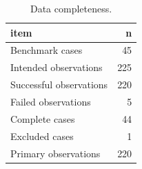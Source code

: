 \begin{table}

\caption{Data completeness.}
\centering
\begin{tabular}[t]{lr}
\toprule
item & n\\
\midrule
Benchmark cases & 45\\
Intended observations & 225\\
Successful observations & 220\\
Failed observations & 5\\
Complete cases & 44\\
\addlinespace
Excluded cases & 1\\
Primary observations & 220\\
\bottomrule
\end{tabular}
\end{table}
